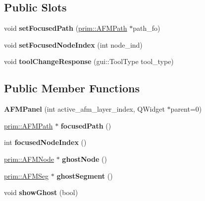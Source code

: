\subsection*{Public Slots}
\begin{DoxyCompactItemize}
\item 
void {\bfseries set\+Focused\+Path} (\hyperlink{classprim_1_1AFMPath}{prim\+::\+A\+F\+M\+Path} $\ast$path\+\_\+fo)\hypertarget{classgui_1_1AFMPanel_a51f99b9925a59084fb8e2ade28c7ac23}{}\label{classgui_1_1AFMPanel_a51f99b9925a59084fb8e2ade28c7ac23}

\item 
void {\bfseries set\+Focused\+Node\+Index} (int node\+\_\+ind)\hypertarget{classgui_1_1AFMPanel_a9e3546ed377fa548532b693921c0c687}{}\label{classgui_1_1AFMPanel_a9e3546ed377fa548532b693921c0c687}

\item 
void {\bfseries tool\+Change\+Response} (gui\+::\+Tool\+Type tool\+\_\+type)\hypertarget{classgui_1_1AFMPanel_a4292a6663637ca0f519286ce376524e4}{}\label{classgui_1_1AFMPanel_a4292a6663637ca0f519286ce376524e4}

\end{DoxyCompactItemize}
\subsection*{Public Member Functions}
\begin{DoxyCompactItemize}
\item 
{\bfseries A\+F\+M\+Panel} (int active\+\_\+afm\+\_\+layer\+\_\+index, Q\+Widget $\ast$parent=0)\hypertarget{classgui_1_1AFMPanel_a7132afbd429bcc6d830c7e5c83957ea7}{}\label{classgui_1_1AFMPanel_a7132afbd429bcc6d830c7e5c83957ea7}

\item 
\hyperlink{classprim_1_1AFMPath}{prim\+::\+A\+F\+M\+Path} $\ast$ {\bfseries focused\+Path} ()\hypertarget{classgui_1_1AFMPanel_a620c2f5c9e4e293faa5b4c952952be26}{}\label{classgui_1_1AFMPanel_a620c2f5c9e4e293faa5b4c952952be26}

\item 
int {\bfseries focused\+Node\+Index} ()\hypertarget{classgui_1_1AFMPanel_a32fe458af1a1714710bdf13fb954db61}{}\label{classgui_1_1AFMPanel_a32fe458af1a1714710bdf13fb954db61}

\item 
\hyperlink{classprim_1_1AFMNode}{prim\+::\+A\+F\+M\+Node} $\ast$ {\bfseries ghost\+Node} ()\hypertarget{classgui_1_1AFMPanel_a72576aaa77159369fa94bb005b394b1b}{}\label{classgui_1_1AFMPanel_a72576aaa77159369fa94bb005b394b1b}

\item 
\hyperlink{classprim_1_1AFMSeg}{prim\+::\+A\+F\+M\+Seg} $\ast$ {\bfseries ghost\+Segment} ()\hypertarget{classgui_1_1AFMPanel_a899736fb82bd6e6dc25d75f27657f26e}{}\label{classgui_1_1AFMPanel_a899736fb82bd6e6dc25d75f27657f26e}

\item 
void {\bfseries show\+Ghost} (bool)\hypertarget{classgui_1_1AFMPanel_a859d8062ef1b76db184f2ee374da19f1}{}\label{classgui_1_1AFMPanel_a859d8062ef1b76db184f2ee374da19f1}

\end{DoxyCompactItemize}


